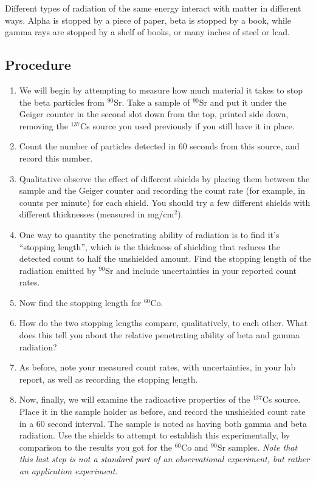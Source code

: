 Different types of radiation of the same energy interact with matter in different ways.
Alpha is stopped by a piece of paper, beta is stopped by a book, while gamma rays are stopped by a shelf of books, or many inches of steel or lead.

\subsection{Procedure}

\begin{enumerate}
	\item We will begin by attempting to measure how much material it takes to stop the beta particles from $^{90}$Sr.
	Take a sample of $^{90}$Sr and put it under the Geiger counter in the second slot down from the top, printed side down, removing the $^{137}$Cs source you used previously if you still have it in place.
	
	\item Count the number of particles detected in 60 seconds from this source, and record this number.
	
	\item Qualitative observe the effect of different shields by placing them between the sample and the Geiger counter and recording the count rate (for example, in counts per minute) for each shield.
	You should try a few different shields with different thicknesses (measured in mg/cm$^2$).
	
	\item One way to quantity the penetrating ability of radiation is to find it's ``stopping length'', which is the thickness of shielding that reduces the detected count to half the unshielded amount. Find the stopping length of the radiation emitted by $^{90}$Sr and include uncertainties in your reported count rates.

	\item Now find the stopping length for $^{60}$Co.
	
	\item How do the two stopping lengths compare, qualitatively, to each other. What does this tell you about the relative penetrating ability of beta and gamma radiation?
	
	\item As before, note your measured count rates, with uncertainties, in your lab report, as well as recording the stopping length.
	
	\item Now, finally, we will examine the radioactive properties of the $^{137}$Cs source.
	Place it in the sample holder as before, and record the unshielded count rate in a 60 second interval.
	The sample is noted as having both gamma and beta radiation.
	Use the shields to attempt to establish this experimentally, by comparison to the results you got for the $^{60}$Co and $^{90}$Sr samples. \textit{Note that this last step is not a standard part of an observational experiment, but rather an application experiment.}
	
\end{enumerate}

